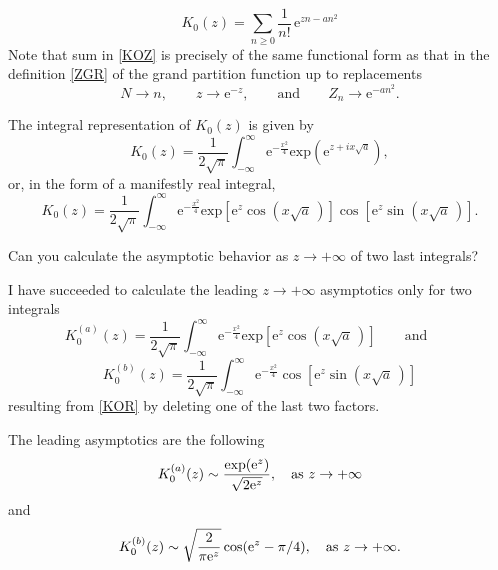 \documentclass[12pt]{article}
\numberwithin{equation}{section}
\newcommand{\be}{\begin{equation}}
\newcommand{\ee}{\end{equation}}
\newcommand{\e}{\mbox{e}}
\newcommand {\MM}[1]{\qquad\mbox{#1}\qquad}
\begin{document}
	\be\label{KOZ}
	K_0(z)=\sum_{n\ge0}\frac1{n!}\,\e^{zn-an^2}
	\ee
	Note that sum in \eqref{KOZ} is precisely of the same functional form as that in the definition \eqref{ZGR} of the grand partition function up to replacements
	\be
	N\to n,\qquad z\to\e^{-z},\MM{and}Z_n\to\e^{-an^2}.
	\ee
	
	The integral representation of $K_0(z)$ is given by
	\be
	K_0(z)=\frac1{2\sqrt\pi}\int_{-\infty}^\infty\e^{-\frac{x^2}4}
	\mbox{exp}\left(\e^{z+ix\sqrt a}\right),
	\ee
	or, in the form of a manifestly real integral,
	\be\label{KOR}
	K_0(z)=\frac1{2\sqrt\pi}\int_{-\infty}^\infty\e^{-\frac{x^2}4}
	\mbox{exp}\left[\e^z\cos(x\sqrt a\,)\right]
	\cos\left[\e^z\sin(x\sqrt a\,)\right].
	\ee
	
	Can you calculate the asymptotic behavior as $z\to+\infty$ of two last integrals?
	
	I have succeeded to calculate the leading $z\to+\infty$ asymptotics only for two integrals
	\be
	K_0^{(a)}(z) = \frac1{2\sqrt\pi} \int_{-\infty}^\infty\e^{-\frac{x^2}4}
	\mbox{exp}\left[\e^z\cos(x\sqrt a\,)\right]\qquad\mbox{and}\qquad
	\ee
	\be
	K_0^{(b)}(z) = \frac1{2\sqrt\pi} \int_{-\infty}^\infty\e^{-\frac{x^2}4}
	\cos\left[\e^z\sin(x\sqrt a\,)\right]
	\ee
	resulting from \eqref{KOR} by deleting one of the last two factors.
	
	The leading asymptotics are the following
	\begin{equation}
		K_0^{(a)}(z) \sim \frac{\exp({\rm e}^z)}{\sqrt{2 {\rm e}^z}}, \quad \text{as } z \to +\infty
	\end{equation}
	and
	\begin{equation}
		K_0^{(b)}(z) \sim \sqrt{\frac{2}{\pi {\rm e}^z}} \cos({\rm e}^z - \pi/4), \quad \text{as } z \to +\infty.
	\end{equation}
	
	\appendix
	
\end{document}
